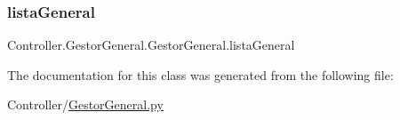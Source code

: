 \subsubsection{\texorpdfstring{lista\+General}{listaGeneral}}
{\footnotesize\ttfamily Controller.\+Gestor\+General.\+Gestor\+General.\+lista\+General}



The documentation for this class was generated from the following file\+:\begin{DoxyCompactItemize}
\item 
Controller/\hyperlink{_gestor_general_8py}{Gestor\+General.\+py}\end{DoxyCompactItemize}
